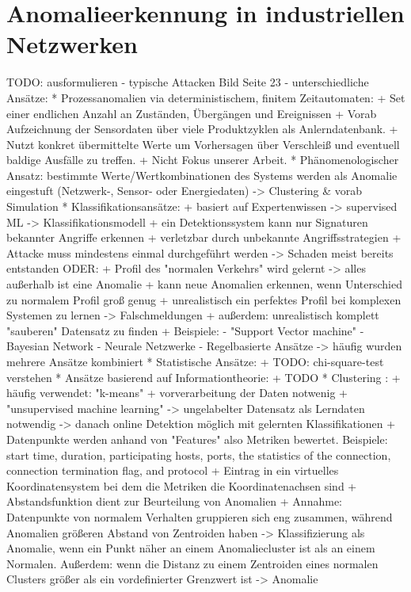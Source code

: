 \section{Anomalieerkennung in industriellen Netzwerken} 
TODO: ausformulieren
- typische Attacken \cite{ahmed2016survey} Bild Seite 23
- unterschiedliche Ansätze:
	* Prozessanomalien via deterministischem, finitem Zeitautomaten:
		+ Set einer endlichen Anzahl an Zuständen, Übergängen und Ereignissen
		+ Vorab Aufzeichnung der Sensordaten über viele Produktzyklen als Anlerndatenbank.
		+ Nutzt konkret übermittelte Werte um Vorhersagen über Verschleiß und eventuell baldige Ausfälle zu treffen.
		+ Nicht Fokus unserer Arbeit.
	* Phänomenologischer Ansatz: bestimmte Werte/Wertkombinationen des Systems werden als Anomalie eingestuft (Netzwerk-, Sensor- oder Energiedaten) -> Clustering & vorab Simulation
	* Klassifikationsansätze:
		+ basiert auf Expertenwissen -> supervised ML -> Klassifikationsmodell
		+ ein Detektionssystem kann nur Signaturen bekannter Angriffe erkennen
		+ verletzbar durch unbekannte Angriffsstrategien
		+ Attacke muss mindestens einmal durchgeführt werden -> Schaden meist bereits entstanden
		ODER:
		+ Profil des "normalen Verkehrs" wird gelernt -> alles außerhalb ist eine Anomalie
		+ kann neue Anomalien erkennen, wenn Unterschied zu normalem Profil groß genug
		+ unrealistisch ein perfektes Profil bei komplexen Systemen zu lernen -> Falschmeldungen
		+ außerdem: unrealistisch komplett "sauberen" Datensatz zu finden
		+ Beispiele:
			- "Support Vector machine" \cite{noble2006support}
			- Bayesian Network \cite{kruegel2003bayesian}
			- Neurale Netzwerke \cite{zhang2001hide}
			- Regelbasierte Ansätze \cite{yang2013rule}
			-> häufig wurden mehrere Ansätze kombiniert
	* Statistische Ansätze:
		+ TODO: chi-square-test verstehen \cite{ye2001anomaly}
	* Ansätze basierend auf Informationtheorie:
		+ TODO
	* Clustering \cite{ahmed2016survey}:
		+ häufig verwendet: "k-means" \cite{likas2003global}
		+ vorverarbeitung der Daten notwenig \cite{munz2007traffic}
		+ "unsupervised machine learning" -> ungelabelter Datensatz als Lerndaten notwendig -> danach online Detektion möglich mit gelernten Klassifikationen \cite{munz2007traffic}
		+ Datenpunkte werden anhand von "Features" also Metriken bewertet. Beispiele: start time, duration, participating hosts, ports, the statistics of the connection, connection termination flag, and protocol \cite{munz2007traffic}
		+ Eintrag in ein virtuelles Koordinatensystem bei dem die Metriken die Koordinatenachsen sind
		+ Abstandsfunktion dient zur Beurteilung von Anomalien
		+ Annahme: Datenpunkte von normalem Verhalten gruppieren sich eng zusammen, während Anomalien größeren Abstand von Zentroiden haben -> Klassifizierung als Anomalie, wenn ein Punkt näher an einem Anomaliecluster ist als an einem Normalen. Außerdem: wenn die Distanz zu einem Zentroiden eines normalen Clusters größer als ein vordefinierter Grenzwert ist -> Anomalie

